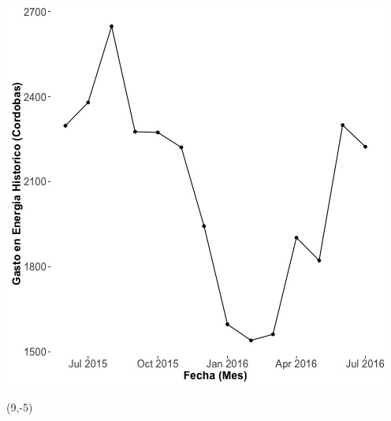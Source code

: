\documentclass{article}\usepackage[]{graphicx}\usepackage[]{color}
\newenvironment{knitrout}{}{} %
\begin{document}
\begin{knitrout}
\color{fgcolor}
\includegraphics[scale=0.65]{figure/A1_historico_cordobas} 
\end{knitrout}

 \begin{textblock}{1}(9,-5)
\begin{minipage}{20em}
\begingroup

\endgroup
\end{minipage}
\end{textblock}


%
\end{document}
